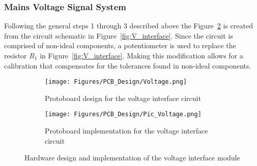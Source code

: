 \subsubsection{Mains Voltage Signal System}
\label{sec:H_V}

Following the general steps 1 through 3 described above the
Figure~\ref{fig:V_hardware_Implementation} is created from the circuit
schematic in Figure~\ref{fig:V_interface}. Since the circuit is
comprised of non-ideal components, a potentiometer is used to replace the
resistor $R_{1}$ in Figure~\ref{fig:V_interface}. Making this
modification allows for a calibration that compensates for the
tolerances found in non-ideal components.

\begin{figure}[H]
     \centering
     \begin{subfigure}[b]{0.495\textwidth}
        \centering
        \texttt{[image: Figures/PCB\_Design/Voltage.png]}
        \caption{Protoboard design for the voltage interface circuit}
        \label{fig:V_hardware_Design}
     \end{subfigure}
     \hfill
     \begin{subfigure}[b]{0.495\textwidth}
        \centering
        \texttt{[image: Figures/PCB\_Design/Pic\_Voltage.png]}
        \caption{Protoboard implementation for the voltage interface circuit}
        \label{fig:V_hardware_Implementation}
     \end{subfigure}
        \caption{Hardware design and implementation of the voltage interface module}
        \label{fig:V_hardware_Comparison}
\end{figure}
